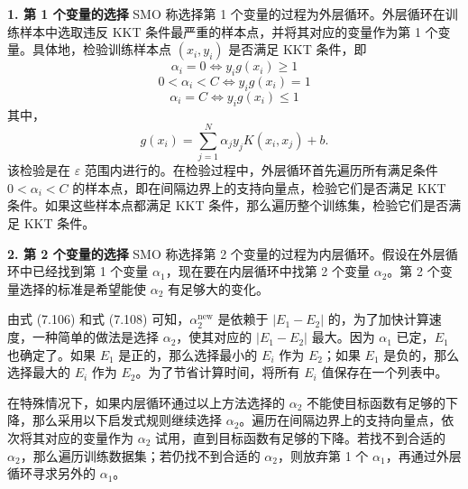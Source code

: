 \documentclass[UTF8, 12pt, fontset=fandol, oneside]{ctexart}
\begin{document}
\noindent\textbf{1. 第 1 个变量的选择}\quad
SMO 称选择第 1 个变量的过程为外层循环。外层循环在训练样本中选取违反 KKT 条件最严重的样本点，并将其对应的变量作为第 1 个变量。具体地，检验训练样本点 $(x_i,y_i)$ 是否满足 KKT 条件，即
\begin{equation}
\alpha_i=0\Leftrightarrow y_i g(x_i)\geq 1
\tag{7.111}
\end{equation}
\begin{equation}
0<\alpha_i<C\Leftrightarrow y_i g(x_i)=1
\tag{7.112}
\end{equation}
\begin{equation}
\alpha_i=C\Leftrightarrow y_i g(x_i)\leq 1
\tag{7.113}
\end{equation}
其中，
\[
g(x_i)=\sum_{j=1}^N\alpha_jy_jK(x_i,x_j)+b.
\]
该检验是在 $\varepsilon$ 范围内进行的。在检验过程中，外层循环首先遍历所有满足条件 $0<\alpha_i<C$ 的样本点，即在间隔边界上的支持向量点，检验它们是否满足 KKT 条件。如果这些样本点都满足 KKT 条件，那么遍历整个训练集，检验它们是否满足 KKT 条件。

\noindent\textbf{2. 第 2 个变量的选择}\quad
SMO 称选择第 2 个变量的过程为内层循环。假设在外层循环中已经找到第 1 个变量 $\alpha_1$，现在要在内层循环中找第 2 个变量 $\alpha_2$。第 2 个变量选择的标准是希望能使 $\alpha_2$ 有足够大的变化。

由式 (7.106) 和式 (7.108) 可知，$\alpha_2^{\mathrm{new}}$ 是依赖于 $|E_1-E_2|$ 的，为了加快计算速度，一种简单的做法是选择 $\alpha_2$，使其对应的 $|E_1-E_2|$ 最大。因为 $\alpha_1$ 已定，$E_1$ 也确定了。如果 $E_1$ 是正的，那么选择最小的 $E_i$ 作为 $E_2$；如果 $E_1$ 是负的，那么选择最大的 $E_i$ 作为 $E_2$。为了节省计算时间，将所有 $E_i$ 值保存在一个列表中。

在特殊情况下，如果内层循环通过以上方法选择的 $\alpha_2$ 不能使目标函数有足够的下降，那么采用以下启发式规则继续选择 $\alpha_2$。遍历在间隔边界上的支持向量点，依次将其对应的变量作为 $\alpha_2$ 试用，直到目标函数有足够的下降。若找不到合适的 $\alpha_2$，那么遍历训练数据集；若仍找不到合适的 $\alpha_2$，则放弃第 1 个 $\alpha_1$，再通过外层循环寻求另外的 $\alpha_1$。
\end{document}
